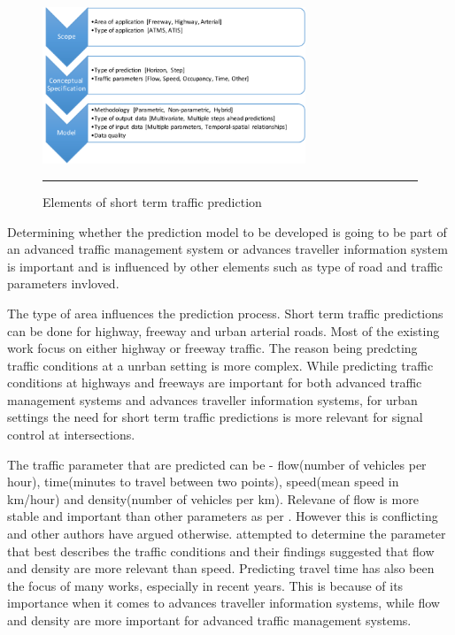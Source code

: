 \begin{figure}[htbp]
  \centering
    \includegraphics[width=0.7\textwidth,height=0.7\textheight,keepaspectratio]{Figures/sttp-process.pdf}
    \rule{35em}{0.5pt}
  \caption[Elements of short term traffic prediction]{Elements of short term traffic prediction}
  \label{fig:sttp-process}
\end{figure}

Determining whether the prediction model to be developed is going to be part of an advanced
traffic management system or advances traveller information system is important and is influenced
by other elements such as type of road and traffic parameters invloved.

The type of area influences the prediction process. Short term traffic predictions can be done for
highway, freeway and urban arterial roads. Most of the existing work focus on either highway or
freeway traffic. The reason being predcting traffic conditions at a unrban setting is more complex.
While predicting traffic conditions at highways and freeways are important for both advanced traffic
management systems and advances traveller information systems, for urban settings the need for short
term traffic predictions is more relevant for signal control at intersections.

The traffic parameter that are predicted can be - flow(number of vehicles per hour), time(minutes
to travel between two points), speed(mean speed in km/hour) and density(number of vehicles per km).
Relevane of flow is more stable and important than other parameters as per \citet{levin1980forecasting}.
However this is conflicting and other authors have argued otherwise. \citet{dougherty1997short} attempted
to determine the parameter that best describes the traffic conditions and their findings suggested that
flow and density are more relevant than speed. Predicting travel time has also been the focus of many
works, especially in recent years. This is because of its importance when it comes to advances traveller
information systems, while flow and density are more important for advanced traffic management systems.

